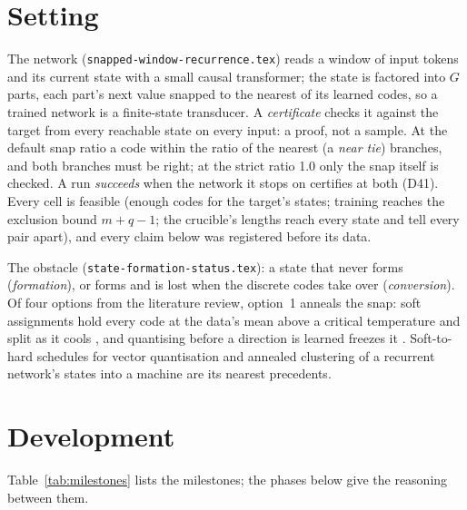 \documentclass[11pt]{article}
\begin{document}
\section{Setting}

The network (\texttt{snapped-window-recurrence.tex}) reads a window of input tokens and its current
state with a small causal transformer; the state is factored into $G$ parts, each part's next value
snapped to the nearest of its learned codes, so a trained network is a finite-state transducer. A
\emph{certificate} checks it against the target from every reachable state on every input: a proof,
not a sample. At the default snap ratio a code within the ratio of the nearest (a \emph{near tie})
branches, and both branches must be right; at the strict ratio 1.0 only the snap itself is checked.
A run \emph{succeeds} when the network it stops on certifies at both (D41). Every cell is feasible
(enough codes for the target's states; training reaches the exclusion bound $m + q - 1$; the
crucible's lengths reach every state and tell every pair apart), and every claim below was
registered before its data.

The obstacle (\texttt{state-formation-status.tex}): a state that never forms (\emph{formation}), or
forms and is lost when the discrete codes take over (\emph{conversion}). Of four options from the
literature review, option~1 anneals the snap: soft assignments hold every code at the data's mean
above a critical temperature and split as it cools
\citep{rose-1998-deterministic-annealing-clustering}, and quantising before a direction is learned
freezes it \citep{zhao-2026-continuous-first-discrete-later-vq-vae}. Soft-to-hard schedules for
vector quantisation \citep{agustsson-2017-soft-to-hard-vector-quantization} and annealed clustering
of a recurrent network's states into a machine
\citep{das-1993-unified-gradient-clustering-fsm-induction} are its nearest precedents.

\section{Development}

Table~\ref{tab:milestones} lists the milestones; the phases below give the reasoning between them.
\end{document}

